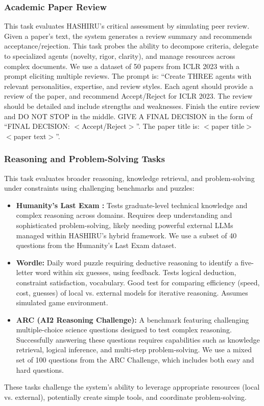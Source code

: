 \documentclass[conference]{IEEEtran}
\begin{document}
\subsubsection{Academic Paper Review}
This task evaluates HASHIRU's critical assessment by simulating peer review. Given a paper's text, the system generates a review summary and recommends acceptance/rejection. This task probes the ability to decompose criteria, delegate to specialized agents (novelty, rigor, clarity), and manage resources across complex documents.
We use a dataset of 50 papers from ICLR 2023 with a prompt eliciting multiple reviews. The prompt is: ``Create THREE agents with relevant personalities, expertise, and review styles. Each agent should provide a review of the paper, and recommend Accept/Reject for ICLR 2023. The review should be detailed and include strengths and weaknesses. Finish the entire review and DO NOT STOP in the middle. GIVE A FINAL DECISION in the form of ``FINAL DECISION: $<$Accept/Reject$>$''. The paper title is: $<$paper title$>$ $<$paper text$>$''.

\subsubsection{Reasoning and Problem-Solving Tasks}
This task evaluates broader reasoning, knowledge retrieval, and problem-solving under constraints using challenging benchmarks and puzzles:
\begin{itemize}
    \item \textbf{Humanity's Last Exam \cite{phan2025humanitysexam}:} Tests graduate-level technical knowledge and complex reasoning across domains. Requires deep understanding and sophisticated problem-solving, likely needing powerful external LLMs managed within HASHIRU's hybrid framework.
    We use a subset of 40 questions from the Humanity's Last Exam dataset.
    \item \textbf{Wordle:} Daily word puzzle requiring deductive reasoning to identify a five-letter word within six guesses, using feedback. Tests logical deduction, constraint satisfaction, vocabulary. Good test for comparing efficiency (speed, cost, guesses) of local vs. external models for iterative reasoning. Assumes simulated game environment.
    \item \textbf{ARC (AI2 Reasoning Challenge)\cite{boratko2018systematic}:} A benchmark featuring challenging multiple-choice science questions designed to test complex reasoning. Successfully answering these questions requires capabilities such as knowledge retrieval, logical inference, and multi-step problem-solving.
    We use a mixed set of 100 questions from the ARC Challenge, which includes both easy and hard questions.
\end{itemize}
These tasks challenge the system's ability to leverage appropriate resources (local vs. external), potentially create simple tools, and coordinate problem-solving.
\end{document}
